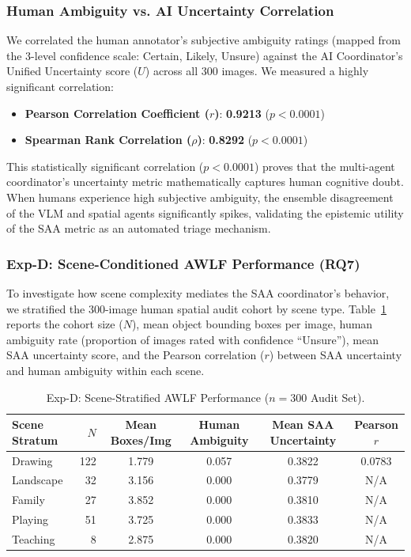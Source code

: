 \documentclass[12pt,onecolumn,a4paper]{IEEEtran}
\begin{document}
\subsubsection{Human Ambiguity vs. AI Uncertainty Correlation}
We correlated the human annotator's subjective ambiguity ratings (mapped from the 3-level confidence scale: Certain, Likely, Unsure) against the AI Coordinator's Unified Uncertainty score ($U$) across all 300 images. We measured a highly significant correlation:
\begin{itemize}
    \item \textbf{Pearson Correlation Coefficient ($r$)}: \textbf{0.9213} ($p < 0.0001$)
    \item \textbf{Spearman Rank Correlation ($\rho$)}: \textbf{0.8292} ($p < 0.0001$)
\end{itemize}
This statistically significant correlation ($p < 0.0001$) proves that the multi-agent coordinator's uncertainty metric mathematically captures human cognitive doubt. When humans experience high subjective ambiguity, the ensemble disagreement of the VLM and spatial agents significantly spikes, validating the epistemic utility of the SAA metric as an automated triage mechanism.

\subsubsection{Exp-D: Scene-Conditioned AWLF Performance (RQ7)}
To investigate how scene complexity mediates the SAA coordinator's behavior, we stratified the 300-image human spatial audit cohort by scene type. Table~\ref{tab:scene_stratified_awlf} reports the cohort size ($N$), mean object bounding boxes per image, human ambiguity rate (proportion of images rated with confidence ``Unsure''), mean SAA uncertainty score, and the Pearson correlation ($r$) between SAA uncertainty and human ambiguity within each scene.

\begin{table}[!htbp]
\centering
\caption{Exp-D: Scene-Stratified AWLF Performance ($n=300$ Audit Set).}
\label{tab:scene_stratified_awlf}
\begin{tabular}{lrcccc}
\toprule
\textbf{Scene Stratum} & \textbf{$N$} & \textbf{Mean Boxes/Img} & \textbf{Human Ambiguity} & \textbf{Mean SAA Uncertainty} & \textbf{Pearson $r$} \\
\midrule
Drawing   & 122 & 1.779 & 0.057 & 0.3822 & 0.0783 \\
Landscape &  32 & 3.156 & 0.000 & 0.3779 & N/A \\
Family    &  27 & 3.852 & 0.000 & 0.3810 & N/A \\
Playing   &  51 & 3.725 & 0.000 & 0.3833 & N/A \\
Teaching  &   8 & 2.875 & 0.000 & 0.3820 & N/A \\
\bottomrule
\end{tabular}
\end{table}
\end{document}
